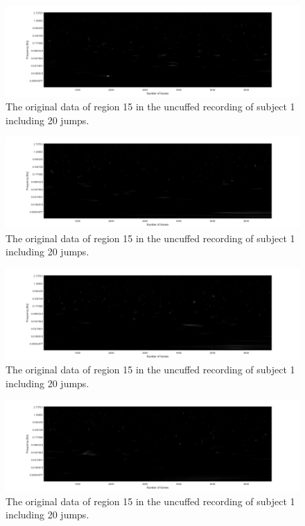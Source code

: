 
\label{t-value}
\begin{figure}[H]
	\includegraphics[width=1\textwidth]{figures/t-values_roi14}
	\caption{The original data of region 15 in the uncuffed recording of subject 1 including 20 jumps.}
	\label{fig:raw15}
\end{figure}
\begin{figure}[H]
	\includegraphics[width=1\textwidth]{figures/t-values_roi20}
	\caption{The original data of region 15 in the uncuffed recording of subject 1 including 20 jumps.}
	\label{fig:raw15}
\end{figure}
\begin{figure}[H]
	\includegraphics[width=1\textwidth]{figures/t-values_roi21}
	\caption{The original data of region 15 in the uncuffed recording of subject 1 including 20 jumps.}
	\label{fig:raw15}
\end{figure}
\begin{figure}[H]
	\includegraphics[width=1\textwidth]{figures/t-values_roi22}
	\caption{The original data of region 15 in the uncuffed recording of subject 1 including 20 jumps.}
	\label{fig:raw15}
\end{figure}
